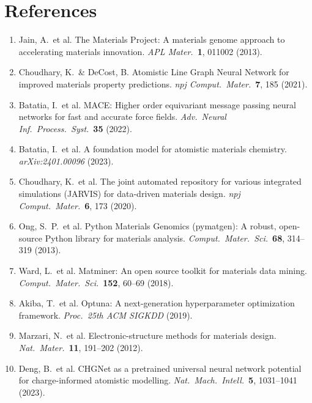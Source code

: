 \documentclass[10pt, a4paper]{article}
\begin{document}
\section*{References}

\begin{enumerate}

  \item Jain, A.\ et al.
    The Materials Project: A materials genome approach to accelerating
    materials innovation.
    \textit{APL Mater.}\ \textbf{1}, 011002 (2013).

  \item Choudhary, K.\ \& DeCost, B.
    Atomistic Line Graph Neural Network for improved materials
    property predictions.
    \textit{npj Comput.\ Mater.}\ \textbf{7}, 185 (2021).
    \label{cite:alignn}

  \item Batatia, I.\ et al.
    MACE: Higher order equivariant message passing neural networks for
    fast and accurate force fields.
    \textit{Adv.\ Neural Inf.\ Process.\ Syst.}\ \textbf{35} (2022).
    \label{cite:mace}

  \item Batatia, I.\ et al.
    A foundation model for atomistic materials chemistry.
    \textit{arXiv:2401.00096} (2023).

  \item Choudhary, K.\ et al.
    The joint automated repository for various integrated simulations
    (JARVIS) for data-driven materials design.
    \textit{npj Comput.\ Mater.}\ \textbf{6}, 173 (2020).

  \item Ong, S.\ P.\ et al.
    Python Materials Genomics (pymatgen): A robust, open-source Python
    library for materials analysis.
    \textit{Comput.\ Mater.\ Sci.}\ \textbf{68}, 314--319 (2013).

  \item Ward, L.\ et al.
    Matminer: An open source toolkit for materials data mining.
    \textit{Comput.\ Mater.\ Sci.}\ \textbf{152}, 60--69 (2018).

  \item Akiba, T.\ et al.
    Optuna: A next-generation hyperparameter optimization framework.
    \textit{Proc.\ 25th ACM SIGKDD} (2019).

  \item Marzari, N.\ et al.
    Electronic-structure methods for materials design.
    \textit{Nat.\ Mater.}\ \textbf{11}, 191--202 (2012).
    \label{cite:marzari}

  \item Deng, B.\ et al.
    CHGNet as a pretrained universal neural network potential for
    charge-informed atomistic modelling.
    \textit{Nat.\ Mach.\ Intell.}\ \textbf{5}, 1031--1041 (2023).
    \label{cite:chgnet}

\end{enumerate}
\end{document}
